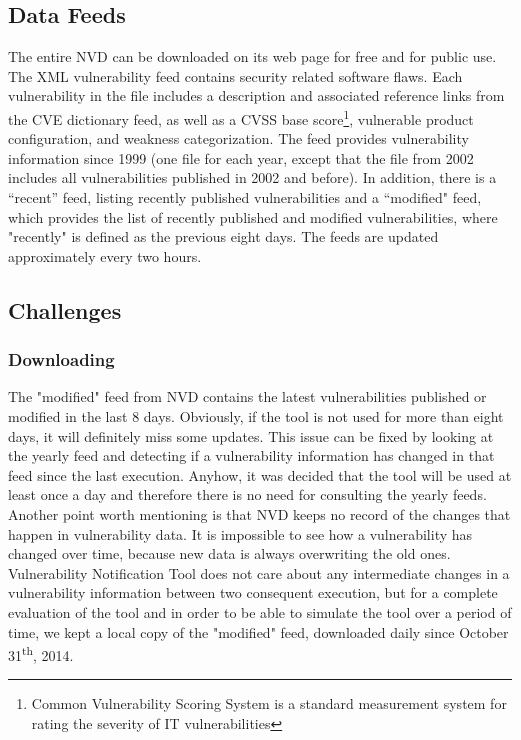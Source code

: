 \subsection{Data Feeds}
The entire NVD can be downloaded on its web page for free and for public use. The XML vulnerability feed contains security related software flaws. Each vulnerability in the file includes a description and associated reference links from the CVE dictionary feed, as well as a CVSS base score\footnote{Common Vulnerability Scoring System is a standard measurement system for rating the severity of IT vulnerabilities}, vulnerable product configuration, and weakness categorization. The feed provides vulnerability information since 1999 (one file for each year, except that the file from 2002 includes all vulnerabilities published in 2002 and before). In addition, there is a ``recent'' feed, listing recently published vulnerabilities and a ``modified" feed, which provides the list of recently published and modified vulnerabilities, where "recently" is defined as the previous eight days. The feeds are updated approximately every two hours.


\subsection{Challenges}
\subsubsection{Downloading}
The "modified" feed from NVD contains the latest vulnerabilities published or modified in the last 8 days. Obviously, if the tool is not used for more than eight days, it will definitely miss some updates. This issue can be fixed by looking at the yearly feed and detecting if a vulnerability information has changed in that feed since the last execution. Anyhow, it was decided that the tool will be used at least once a day and therefore there is no need for consulting the yearly feeds. 
Another point worth mentioning is that NVD keeps no record of the changes that happen in vulnerability data. It is impossible to see how a vulnerability has changed over time, because new data is always overwriting the old ones. Vulnerability Notification Tool does not care about any intermediate changes in a vulnerability information between two consequent execution, but for a complete evaluation of the tool and in order to be able to simulate the tool over a period of time, we kept a local copy of the "modified" feed, downloaded daily since October 31\textsuperscript{th}, 2014. 
